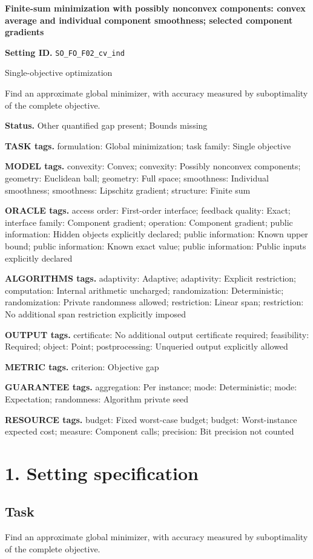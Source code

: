 \documentclass[10pt,a4paper]{article}
\begin{document}
\raggedright

{\LARGE\bfseries\sffamily\color{AtlasNavy} Finite-sum minimization with possibly nonconvex components: convex average and individual component smoothness; selected component gradients\par}\vspace{5pt}
\textbf{Setting ID.} \texttt{SO\_\allowbreak{}FO\_\allowbreak{}F02\_\allowbreak{}cv\_\allowbreak{}ind}

Single-objective optimization

Find an approximate global minimizer, with accuracy measured by suboptimality of the complete objective.

\textbf{Status.} Other quantified gap present; Bounds missing

\textbf{TASK tags.} formulation: Global minimization; task family: Single objective

\textbf{MODEL tags.} convexity: Convex; convexity: Possibly nonconvex components; geometry: Euclidean ball; geometry: Full space; smoothness: Individual smoothness; smoothness: Lipschitz gradient; structure: Finite sum

\textbf{ORACLE tags.} access order: First-order interface; feedback quality: Exact; interface family: Component gradient; operation: Component gradient; public information: Hidden objects explicitly declared; public information: Known upper bound; public information: Known exact value; public information: Public inputs explicitly declared

\textbf{ALGORITHMS tags.} adaptivity: Adaptive; adaptivity: Explicit restriction; computation: Internal arithmetic uncharged; randomization: Deterministic; randomization: Private randomness allowed; restriction: Linear span; restriction: No additional span restriction explicitly imposed

\textbf{OUTPUT tags.} certificate: No additional output certificate required; feasibility: Required; object: Point; postprocessing: Unqueried output explicitly allowed

\textbf{METRIC tags.} criterion: Objective gap

\textbf{GUARANTEE tags.} aggregation: Per instance; mode: Deterministic; mode: Expectation; randomness: Algorithm private seed

\textbf{RESOURCE tags.} budget: Fixed worst-case budget; budget: Worst-instance expected cost; measure: Component calls; precision: Bit precision not counted

\section{1. Setting specification}
\subsection{Task}
Find an approximate global minimizer, with accuracy measured by suboptimality of the complete objective.
\end{document}

